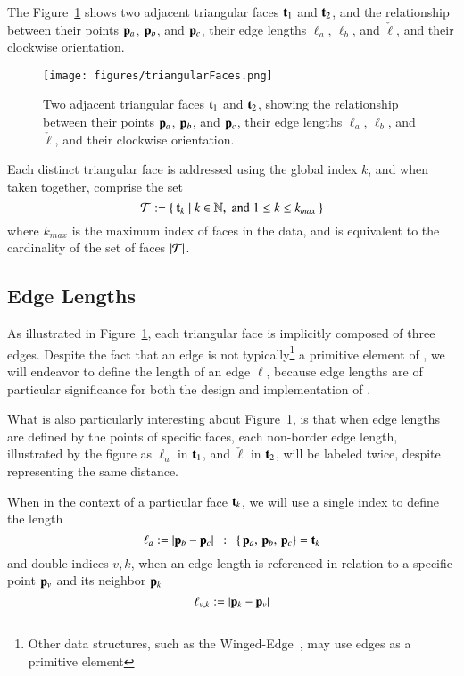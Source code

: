 The Figure~\ref{fig:triangularFaces} shows two adjacent triangular faces $\mathbf{t}_1$ and $\mathbf{t}_2$, and the relationship between their points $\mathbf{p}_a$, $\mathbf{p}_b$, and $\mathbf{p}_c$, their edge lengths $\ell_a$, $\ell_b$, and $\check{\ell}$, and their clockwise orientation.

\begin{figure}
\ffigbox
	{\texttt{[image: figures/triangularFaces.png]}}
	{\caption[Two Triangular Faces]{Two adjacent triangular faces $\mathbf{t}_1$ and $\mathbf{t}_2$, showing the relationship between their points $\mathbf{p}_a$, $\mathbf{p}_b$, and $\mathbf{p}_c$, their edge lengths $\ell_a$, $\ell_b$, and $\check{\ell}$, and their clockwise orientation.}\label{fig:triangularFaces}}
\end{figure}

Each distinct triangular face is addressed using the global index $k$, and when taken together, comprise the set
%
\begin{equation}
	\mathcal{T} := \left \{\:\mathbf{t}_k \mid k \in \mathbb{N}, \;\text{and}\; 1\leq k \leq k_{max}\:\right \}
	\label{eq:defineSetOfFaces}
\end{equation}
%
where $k_{max}$ is the maximum index of faces in the data, and is equivalent to the cardinality of the set of faces $|\mathcal{T}|$.%
%
%

%
%
%
\subsection{Edge Lengths}
\label{ch2s3ssEL}
As illustrated in Figure~\ref{fig:triangularFaces}, each triangular face is implicitly composed of three edges. Despite the fact that an edge is not typically\footnote{Other data structures, such as the Winged-Edge~\cite[p.~1]{Baumgart75}, may use edges as a primitive element} a primitive element of \tdd{}, we will endeavor to define the length of an edge $\ell$, because edge lengths are of particular significance for both the design and implementation of .

What is also particularly interesting about Figure~\ref{fig:triangularFaces}, is that when edge lengths are defined by the points of specific faces, each non-border edge length, illustrated by the figure as $\ell_a$ in $\mathbf{t}_1$, and $\check{\ell}$ in $\mathbf{t}_2$, will be labeled twice, despite representing the same distance.

When in the context of a particular face $\mathbf{t}_k$, we will use a single index to define the length
%
\begin{equation}
	\ell_a := |\mathbf{p}_b - \mathbf{p}_c| \enspace:\enspace \left \{\,\mathbf{p}_a,\,\mathbf{p}_b,\,\mathbf{p}_c\right \} = \mathbf{t}_k
	\label{eq:defineEdgeLengthFace}
\end{equation}%
%
%
and double indices $v,k$, when an edge length is referenced in relation to a specific point $\mathbf{p}_v$ and its neighbor $\mathbf{p}_k$
%
\begin{equation}
	\ell_{v,k} := |\mathbf{p}_k - \mathbf{p}_v|
	\label{eq:defineEdgeLengthPoint}
\end{equation}%
%

